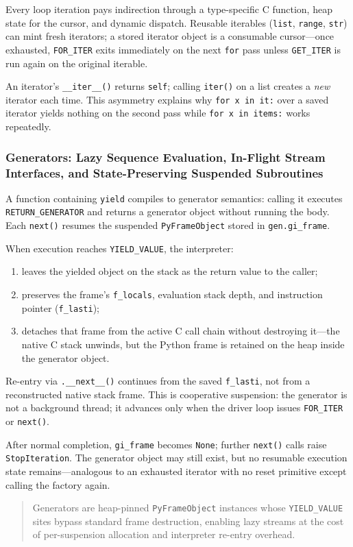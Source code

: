 Every loop iteration pays indirection through a type-specific C function, heap state for the cursor, and dynamic dispatch. Reusable iterables (\texttt{list}, \texttt{range}, \texttt{str}) can mint fresh iterators; a stored iterator object is a consumable cursor---once exhausted, \texttt{FOR\_ITER} exits immediately on the next \texttt{for} pass unless \texttt{GET\_ITER} is run again on the original iterable.

An iterator's \texttt{\_\_iter\_\_()} returns \texttt{self}; calling \texttt{iter()} on a list creates a \emph{new} iterator each time. This asymmetry explains why \texttt{for x in it:} over a saved iterator yields nothing on the second pass while \texttt{for x in items:} works repeatedly.

\subsubsection{Generators: Lazy Sequence Evaluation, In-Flight Stream Interfaces, and State-Preserving Suspended Subroutines}

A function containing \texttt{yield} compiles to generator semantics: calling it executes \texttt{RETURN\_GENERATOR} and returns a generator object without running the body. Each \texttt{next()} resumes the suspended \texttt{PyFrameObject} stored in \texttt{gen.gi\_frame}.

When execution reaches \texttt{YIELD\_VALUE}, the interpreter:

\begin{enumerate}
    \item leaves the yielded object on the stack as the return value to the caller;
    \item preserves the frame's \texttt{f\_locals}, evaluation stack depth, and instruction pointer (\texttt{f\_lasti});
    \item detaches that frame from the active C call chain without destroying it---the native C stack unwinds, but the Python frame is retained on the heap inside the generator object.
\end{enumerate}

Re-entry via \texttt{.\_\_next\_\_()} continues from the saved \texttt{f\_lasti}, not from a reconstructed native stack frame. This is cooperative suspension: the generator is not a background thread; it advances only when the driver loop issues \texttt{FOR\_ITER} or \texttt{next()}.

After normal completion, \texttt{gi\_frame} becomes \texttt{None}; further \texttt{next()} calls raise \texttt{StopIteration}. The generator object may still exist, but no resumable execution state remains---analogous to an exhausted iterator with no reset primitive except calling the factory again.

\begin{quote}
Generators are heap-pinned \texttt{PyFrameObject} instances whose \texttt{YIELD\_VALUE} sites bypass standard frame destruction, enabling lazy streams at the cost of per-suspension allocation and interpreter re-entry overhead.
\end{quote}
